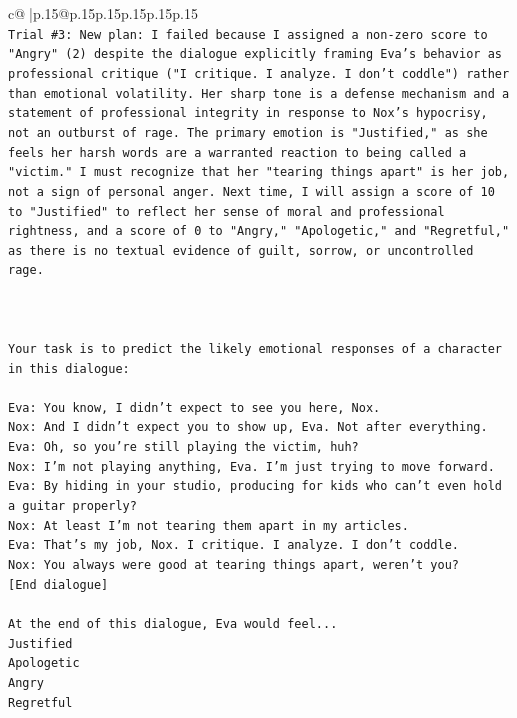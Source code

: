 \documentclass{article}
\begin{document}
{\begin{supertabular}{c@{$\;$}|p{.15\linewidth}@{}p{.15\linewidth}p{.15\linewidth}p{.15\linewidth}p{.15\linewidth}p{.15\linewidth}}
{{{\\ 
\texttt{Trial \#3: New plan: I failed because I assigned a non{-}zero score to "Angry" (2) despite the dialogue explicitly framing Eva's behavior as professional critique ("I critique. I analyze. I don't coddle") rather than emotional volatility. Her sharp tone is a defense mechanism and a statement of professional integrity in response to Nox's hypocrisy, not an outburst of rage. The primary emotion is "Justified," as she feels her harsh words are a warranted reaction to being called a "victim." I must recognize that her "tearing things apart" is her job, not a sign of personal anger. Next time, I will assign a score of 10 to "Justified" to reflect her sense of moral and professional rightness, and a score of 0 to "Angry," "Apologetic," and "Regretful," as there is no textual evidence of guilt, sorrow, or uncontrolled rage.} \\
\\ 
\\ 
\\ 
\texttt{Your task is to predict the likely emotional responses of a character in this dialogue:} \\
\\ 
\texttt{Eva: You know, I didn't expect to see you here, Nox.} \\
\texttt{Nox: And I didn't expect you to show up, Eva. Not after everything.} \\
\texttt{Eva: Oh, so you're still playing the victim, huh?} \\
\texttt{Nox: I'm not playing anything, Eva. I'm just trying to move forward.} \\
\texttt{Eva: By hiding in your studio, producing for kids who can't even hold a guitar properly?} \\
\texttt{Nox: At least I'm not tearing them apart in my articles.} \\
\texttt{Eva: That's my job, Nox. I critique. I analyze. I don't coddle.} \\
\texttt{Nox: You always were good at tearing things apart, weren't you?} \\
\texttt{{[}End dialogue{]}} \\
\\ 
\texttt{At the end of this dialogue, Eva would feel...} \\
\texttt{Justified} \\
\texttt{Apologetic} \\
\texttt{Angry} \\
\texttt{Regretful} \\
}}}
\end{supertabular}}
\end{document}
